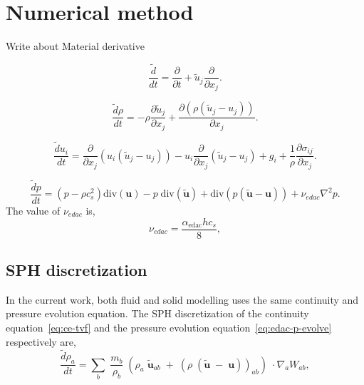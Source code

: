 \documentclass[preprint,12pt]{elsarticle}
\newcommand{\ten}[1]{\ensuremath{\mathbf{#1}}}
\begin{document}
\section{Numerical method}

Write about Material derivative

\begin{equation}
  \label{eq:modified-material-derivative}
  \frac{\tilde{d} }{d t} = \frac{\partial }{\partial t} +
  \tilde{u}_j \frac{\partial }{\partial x_j}.
\end{equation}

\begin{equation}
  \label{eq:ce-tvf}
  \frac{\tilde{d} \rho}{d t} =
  - \rho \frac{\partial \tilde{u}_j}{\partial x_j} +
  \frac{\partial (\rho (\tilde{u}_j - u_j))}{\partial x_j}.
\end{equation}

\begin{equation}
  \label{eq:mom-tvf}
  \frac{\tilde{d} u_i}{d t} =
  \frac{\partial}{\partial x_j} (u_i (\tilde{u}_j - u_j))
  - u_i \frac{\partial}{\partial x_j} (\tilde{u}_j - u_j)
  + g_i
  +\frac{1}{\rho} \frac{\partial \sigma_{ij}}{\partial x_j}.
\end{equation}


\begin{equation}
  \label{eq:edac-p-evolve}
  \frac{\tilde{d} p}{d t} =
  (p -\rho c_s^2)
    \text{div}(\ten{u})
  - p \; \text{div}(\tilde{\ten{u}})
    + \text{div}(p (\tilde{\ten{u}} - \ten{u}))
    + \nu_{edac}  \nabla^2 p.
\end{equation}
%
The value of $\nu_{edac}$ is,
\begin{equation}
  \label{eq:nu-edac}
  \nu_{edac} = \frac{\alpha_{\textrm{edac}} h c_s}{8},
\end{equation}


\subsection{SPH discretization}

In the current work, both fluid and solid modelling uses the same continuity
and pressure evolution equation. The SPH discretization of the continuity
equation~\eqref{eq:ce-tvf} and the pressure evolution
equation~\eqref{eq:edac-p-evolve} respectively are,
\begin{equation}
  \label{eq:sph-discretization-continuity}
  \frac{\tilde{d}\rho_a}{dt} = \sum_{b} \; \frac{m_b}{\rho_{b}} \; (
  \rho_{a} \; \tilde{\ten{u}}_{ab} \; + \;
  (\rho \; (\tilde{\ten{u}} \; - \;
  \ten{u}))_{ab}) \; \cdot \nabla_{a} W_{ab},
\end{equation}
\end{document}
